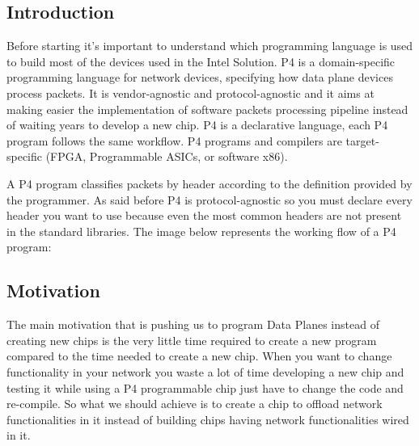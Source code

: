 \documentclass[../sn.tex]{subfiles}
\begin{document}
\subsection{Introduction}
Before starting it's important to understand which programming language is used to build most of the devices used in the Intel Solution.
P4 is a domain-specific programming language for network devices, specifying how data plane devices process packets.
It is vendor-agnostic and protocol-agnostic and it aims at making easier the implementation of software packets processing pipeline instead of waiting years to develop a new chip.
P4 is a declarative language, each P4 program follows the same workflow.
P4 programs and compilers are target-specific (FPGA, Programmable ASICs, or software x86).

A P4 program classifies packets by header according to the definition provided by the programmer.
As said before P4 is protocol-agnostic so you must declare every header you want to use because even the most common headers are not present in the standard libraries.
The image below represents the working flow of a P4 program:

\subsection{Motivation}
The main motivation that is pushing us to program Data Planes instead of creating new chips is the very little time required to create a new program compared to the time needed to create a new chip.
When you want to change functionality in your network you waste a lot of time developing a new chip and testing it while using a P4 programmable chip just have to change the code and re-compile.
So what we should achieve is to create a chip to offload network functionalities in it instead of building chips having network functionalities wired in it.
\end{document}

